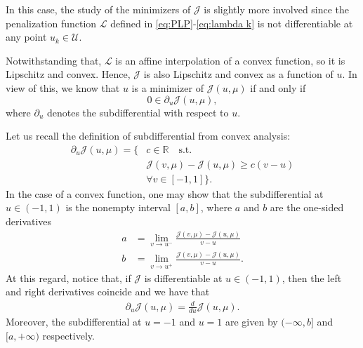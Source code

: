 \documentclass[twocolumn]{autart}    %
\begin{document}
In this case, the study of the minimizers of $\mathcal{J}$ is slightly more involved since the penalization function $\mathcal{L}$ defined in \eqref{eq:PLP}-\eqref{eq:lambda k} is not differentiable at any point $u_k\in\mathcal U$.

Notwithstanding that, $\mathcal{L}$ is an affine interpolation of a convex function, so it is Lipschitz and convex.  Hence, $\mathcal{J}$ is also Lipschitz and convex as a function of $u$. In view of this, we know that $u$ is a minimizer of $\mathcal{J} (u,\mu)$ if and only if
\begin{equation}\label{opti cond subdiff}
	0\in \partial_u \mathcal{J} (u,\mu),
\end{equation}
where $\partial_u$ denotes the subdifferential with respect to $u$. 

Let us recall the definition of subdifferential from convex analysis:
\begin{align*}
	\partial_u \mathcal{J} (u,\mu) = \{  & c\in \mathbb{R} \quad \text{s.t.} 
	\\
	&\mathcal{J} (v,\mu) - \mathcal{J} (u,\mu) \geq c(v-u) 
	\\
	& \forall v\in [-1,1] \}. 
\end{align*}
In the case of a convex function, one may show that the subdifferential at $u\in (-1,1)$ is the nonempty interval $[a,b]$, where $a$ and $b$ are the one-sided derivatives
\begin{align*}
	a &= \lim_{v\to u^-} \frac{\mathcal{J} (v,\mu) - \mathcal{J}(u,\mu)}{v-u} 
	\\[5pt]
	b &= \lim_{v\to u^+} \frac{\mathcal{J} (v,\mu) - \mathcal{J}(u,\mu)}{v-u}. 
\end{align*}
At this regard, notice that, if $\mathcal J$ is differentiable at $u\in (-1,1)$, then the left and right derivatives coincide and we have that
\begin{align*}
	\partial_u \mathcal J(u,\mu) = \frac{d}{du} \mathcal J(u,\mu).
\end{align*}
Moreover, the subdifferential at $u=-1$ and $u=1$ are given by $(-\infty, b]$ and $[a,+\infty)$ respectively.
\end{document}
